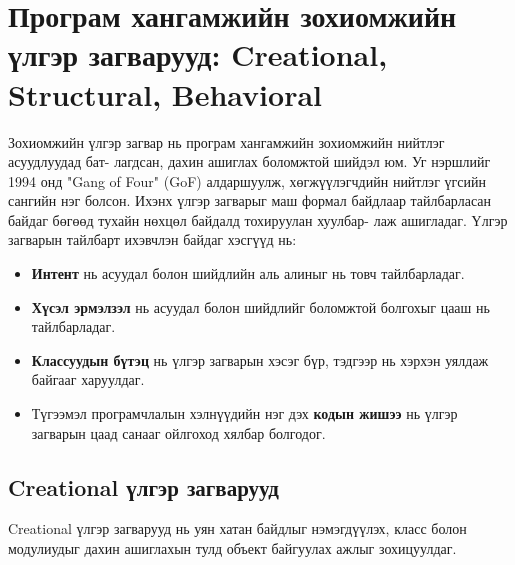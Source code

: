 \section{Програм хангамжийн зохиомжийн үлгэр загварууд: Creational, Structural, Behavioral}
Зохиомжийн үлгэр загвар нь програм хангамжийн зохиомжийн нийтлэг асуудлуудад бат- лагдсан, дахин ашиглах боломжтой шийдэл юм. Уг нэршлийг 1994 онд "Gang of Four" (GoF) алдаршуулж, хөгжүүлэгчдийн нийтлэг үгсийн сангийн нэг болсон. Ихэнх үлгэр загварыг маш формал байдлаар тайлбарласан байдаг бөгөөд тухайн нөхцөл байдалд тохируулан хуулбар- лаж ашигладаг. Үлгэр загварын тайлбарт ихэвчлэн байдаг хэсгүүд нь:
\begin{itemize}
	\item \textbf{Интент} нь асуудал болон шийдлийн аль алиныг нь товч тайлбарладаг.
	\item \textbf{Хүсэл эрмэлзэл} нь асуудал болон шийдлийг боломжтой болгохыг цааш нь тайлбарладаг.
	\item \textbf{Классуудын бүтэц} нь үлгэр загварын хэсэг бүр, тэдгээр нь хэрхэн уялдаж байгааг харуулдаг.
	\item Түгээмэл програмчлалын хэлнүүдийн нэг дэх \textbf{кодын жишээ} нь үлгэр загварын цаад санааг ойлгоход хялбар болгодог.
\end{itemize}
\subsection{Creational үлгэр загварууд}
Creational үлгэр загварууд нь уян хатан байдлыг нэмэгдүүлэх, класс болон модулиудыг дахин ашиглахын тулд объект байгуулах ажлыг зохицуулдаг.

